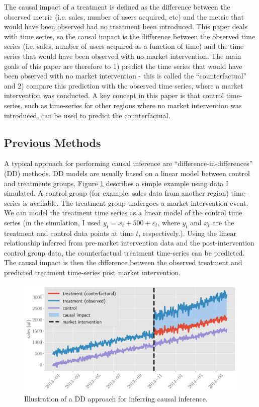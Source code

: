 \documentclass[12pt]{article}
\begin{document}
The causal impact of a treatment is defined as the difference between the observed metric (i.e. sales, number of users acquired, etc) and the metric that would have been observed had no treatment been introduced. This paper deals with time series, so the causal impact is the difference between the observed time series (i.e. sales, number of users acquired as a function of time) and the time series that would have been observed with no market intervention. The main goals of this paper are therefore to 1) predict the time series that would have been observed with no market intervention - this is called the ``counterfactual'' and 2) compare this prediction with the observed time series, where a market intervention was conducted.  A key concept in this paper is that control time-series, such as time-series for other regions where no market intervention was introduced, can be used to predict the counterfactual.

\subsection{Previous Methods}
A typical approach for performing causal inference are ``difference-in-differences'' (DD) methods. DD models are usually based on a linear model between control and treatments groups. Figure \ref{dd} describes a simple example using data I simulated. A control group (for example, sales data from another region) time-series is  available. The treatment group undergoes a  market intervention event. We can model the treatment time series as a linear model of the control time series (in the simulation, I used $y_t = x_t + 500 + \varepsilon_t$, where $y_t$ and $x_t$ are the treatment and control data points at time $t$, respectively.). Using the linear relationship inferred from pre-market intervention data and the post-intervention control group data, the counterfactual treatment time-series can be predicted. The causal impact is then the difference between the observed treatment and predicted treatment time-series post market intervention. 

\begin{figure}[!h]
    \centering
    \includegraphics[scale=.6
    ]{../figures/dd.png}
    \caption{Illustration of a DD approach for inferring causal inference. }
    \label{dd}
\end{figure}
\end{document}

